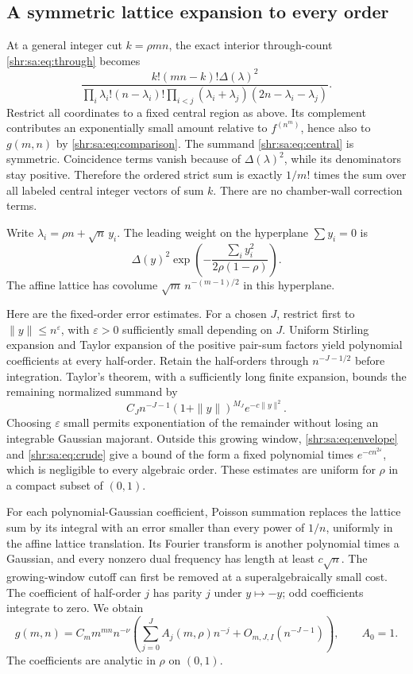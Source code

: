 \documentclass[11pt,letterpaper]{article}
\numberwithin{equation}{section}
\theoremstyle{definition}
\newcommand{\1}{\mathbf 1}
\newcommand{\D}{\Delta}
\begin{document}
\subsection{A symmetric lattice expansion to every order}
At a general integer cut $k=\rho mn$, the exact interior through-count \eqref{shr:sa:eq:through} becomes
\begin{equation}\label{shr:sa:eq:central}
 \frac{k!(mn-k)!\D(\lambda)^2}
 {\displaystyle\prod_i\lambda_i!(n-\lambda_i)!
  \prod_{i<j}(\lambda_i+\lambda_j)(2n-\lambda_i-\lambda_j)}.
\end{equation}
Restrict all coordinates to a fixed central region as above. Its complement contributes an exponentially small amount relative to $f^{(n^m)}$, hence also to $g(m,n)$ by \eqref{shr:sa:eq:comparison}. The summand \eqref{shr:sa:eq:central} is symmetric. Coincidence terms vanish because of $\D(\lambda)^2$, while its denominators stay positive. Therefore the ordered strict sum is exactly $1/m!$ times the sum over all labeled central integer vectors of sum $k$. There are no chamber-wall correction terms.

Write $\lambda_i=\rho n+\sqrt n\,y_i$. The leading weight on the hyperplane $\sum y_i=0$ is
\begin{equation}\label{shr:sa:eq:gaussian}
 \D(y)^2\exp\left(-\frac{\sum_i y_i^2}{2\rho(1-\rho)}\right).
\end{equation}
The affine lattice has covolume $\sqrt m\,n^{-(m-1)/2}$ in this hyperplane.

Here are the fixed-order error estimates. For a chosen $J$, restrict first to $\|y\|\le n^\varepsilon$, with $\varepsilon>0$ sufficiently small depending on $J$. Uniform Stirling expansion and Taylor expansion of the positive pair-sum factors yield polynomial coefficients at every half-order. Retain the half-orders through $n^{-J-1/2}$ before integration. Taylor's theorem, with a sufficiently long finite expansion, bounds the remaining normalized summand by
\[
 C_J n^{-J-1}(1+\|y\|)^{M_J}e^{-c\|y\|^2}.
\]
Choosing $\varepsilon$ small permits exponentiation of the remainder without losing an integrable Gaussian majorant. Outside this growing window, \eqref{shr:sa:eq:envelope} and \eqref{shr:sa:eq:crude} give a bound of the form a fixed polynomial times $e^{-c n^{2\varepsilon}}$, which is negligible to every algebraic order. These estimates are uniform for $\rho$ in a compact subset of $(0,1)$.

For each polynomial-Gaussian coefficient, Poisson summation replaces the lattice sum by its integral with an error smaller than every power of $1/n$, uniformly in the affine lattice translation. Its Fourier transform is another polynomial times a Gaussian, and every nonzero dual frequency has length at least $c\sqrt n$. The growing-window cutoff can first be removed at a superalgebraically small cost. The coefficient of half-order $j$ has parity $j$ under $y\mapsto-y$; odd coefficients integrate to zero. We obtain
\begin{equation}\label{shr:sa:eq:rhoexp}
 g(m,n)=C_m m^{mn}n^{-\nu}
 \left(\sum_{j=0}^J A_j(m,\rho)n^{-j}+O_{m,J,I}(n^{-J-1})\right),
 \qquad A_0=1.
\end{equation}
The coefficients are analytic in $\rho$ on $(0,1)$.
\end{document}
